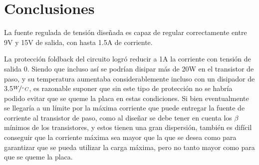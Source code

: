 \documentclass{article}
\begin{document}
\newgeometry{} %


\tableofcontents
\newpage










\section{Conclusiones}

La fuente regulada de tensi\'on dise\~nada es capaz de regular correctamente entre 9V y 15V de salida, con hasta 1.5A de corriente.

La protecci\'on foldback del circuito logr\'o reducir a 1A la corriente con tensi\'on de salida 0. Siendo que incluso as\'i se podr\'ian disipar m\'as de 20W en el transistor de paso, y su temperatura aumentaba considerablemente incluso con un disipador de 3.5$\nicefrac{W}{^\circ C}$,  es razonable suponer que sin este tipo de protecci\'on no se habr\'ia podido evitar que se queme la placa en estas condiciones. Si bien eventualmente se llegar\'ia a un l\'imite por la m\'axima corriente que puede entregar la fuente de corriente al transistor de paso, como al dise\~nar se debe tener en cuenta los $\beta$ m\'inimos de los transistores, y estos tienen una gran dispersi\'on, tambi\'en es dif\'icil conseguir que la corriente m\'axima sea mayor que la que se desea como para garantizar que se pueda utilizar la carga m\'axima, pero no tanto mayor como para que se queme la placa. 
 




\clearpage
\end{document}
